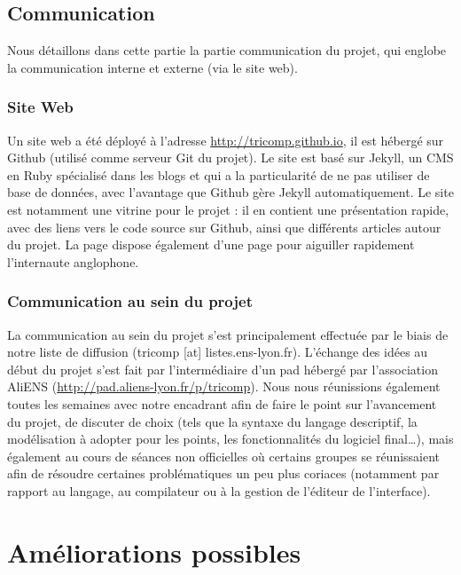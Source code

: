 \documentclass{article}
\begin{document}
\subsection{Communication}

Nous détaillons dans cette partie la partie communication du projet,
qui englobe la communication interne et externe (via le site web).

\subsubsection{Site Web}

Un site web a été déployé à l'adresse \url{http://tricomp.github.io}, il est hébergé
sur Github (utilisé comme serveur Git du projet). Le site est basé sur Jekyll, un 
CMS en Ruby spécialisé dans les blogs et qui a la particularité de ne pas utiliser 
de base de données, avec l'avantage que Github gère Jekyll automatiquement. Le site 
est notamment une vitrine pour le projet : il en contient une présentation rapide, 
avec des liens vers le code source sur Github, ainsi que différents articles autour du projet.
La page dispose également d'une page pour aiguiller rapidement l'internaute anglophone.


\subsubsection{Communication au sein du projet}

La communication au sein du projet s'est principalement effectuée par le biais de notre liste
de diffusion (tricomp [at] listes.ens-lyon.fr). L'échange des idées au début du projet s'est 
fait par l'intermédiaire d'un pad hébergé par l'association AliENS (\url{http://pad.aliens-lyon.fr/p/tricomp}). 
Nous nous réunissions également toutes les semaines avec notre encadrant afin de faire le point 
sur l'avancement du projet, de discuter de choix (tels que la syntaxe du langage descriptif, 
la modélisation à adopter pour les points, les fonctionnalités du logiciel final\dots), mais 
également au cours de séances non officielles où certains groupes se réunissaient 
afin de résoudre certaines problématiques un peu plus coriaces (notamment par rapport au langage, 
au compilateur ou à la gestion de l'éditeur de l'interface).

\section{Améliorations possibles}
\end{document}
